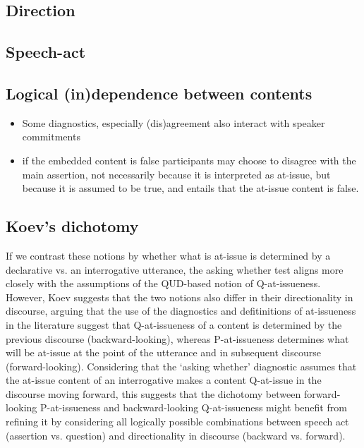   \subsection{Direction}
  \subsection{Speech-act}
  \subsection{Logical (in)dependence between contents}
    \begin{itemize}
      \item Some diagnostics, especially (dis)agreement also interact with speaker commitments

      \item if the embedded content is false participants may choose to disagree with the main assertion, not necessarily because it is interpreted as at-issue, but because it is assumed to be true, and entails that the at-issue content is false.

    \end{itemize}

  \subsection{Koev's dichotomy}
    If we contrast these notions by whether what is at-issue is determined by a declarative vs. an interrogative utterance, the asking whether test aligns more closely with the assumptions of the QUD-based notion of Q-at-issueness. However, Koev suggests that the two notions also differ in their directionality in discourse, arguing that the use of the diagnostics and defitinitions of at-issueness in the literature suggest that Q-at-issueness of a content is determined by the previous discourse (backward-looking), whereas P-at-issueness determines what will be at-issue at the point of the utterance and in subsequent discourse (forward-looking). Considering that the `asking whether' diagnostic assumes that the at-issue content of an interrogative makes a content Q-at-issue in the discourse moving forward, this suggests that the dichotomy between forward-looking P-at-issueness and backward-looking Q-at-issueness might benefit from refining it by considering all logically possible combinations between speech act (assertion vs. question) and directionality in discourse (backward vs. forward).
